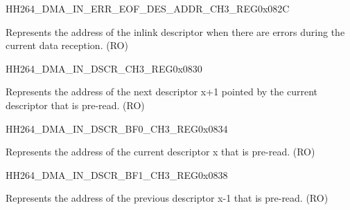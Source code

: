     
    \begin{register}{H}{H264\_DMA\_IN\_ERR\_EOF\_DES\_ADDR\_CH3\_REG}{0x082C}\label{regdesc:H264DMAINERREOFDESADDRCH3REG}
    \regnewline%
    \begin{regdesc}\begin{reglist}
    \label{fielddesc:H264DMAINERREOFDESADDRCH3}\item [H264\_DMA\_IN\_ERR\_EOF\_DES\_ADDR\_CH3] Represents the address of the inlink descriptor when there are errors during the current data reception. (RO)
    \end{reglist}\end{regdesc}
    \end{register}
    
    
    \begin{register}{H}{H264\_DMA\_IN\_DSCR\_CH3\_REG}{0x0830}\label{regdesc:H264DMAINDSCRCH3REG}
    \regnewline%
    \begin{regdesc}\begin{reglist}
    \label{fielddesc:H264DMAINLINKDSCRCH3}\item [H264\_DMA\_INLINK\_DSCR\_CH3] Represents the address of the next descriptor x+1 pointed by the current descriptor that is pre-read. (RO)
    \end{reglist}\end{regdesc}
    \end{register}
    
    
    \begin{register}{H}{H264\_DMA\_IN\_DSCR\_BF0\_CH3\_REG}{0x0834}\label{regdesc:H264DMAINDSCRBF0CH3REG}
    \regnewline%
    \begin{regdesc}\begin{reglist}
    \label{fielddesc:H264DMAINLINKDSCRBF0CH3}\item [H264\_DMA\_INLINK\_DSCR\_BF0\_CH3] Represents the address of the current descriptor x that is pre-read. (RO)
    \end{reglist}\end{regdesc}
    \end{register}
    
    
    \begin{register}{H}{H264\_DMA\_IN\_DSCR\_BF1\_CH3\_REG}{0x0838}\label{regdesc:H264DMAINDSCRBF1CH3REG}
    \regnewline%
    \begin{regdesc}\begin{reglist}
    \label{fielddesc:H264DMAINLINKDSCRBF1CH3}\item [H264\_DMA\_INLINK\_DSCR\_BF1\_CH3] Represents the address of the previous descriptor x-1 that is pre-read. (RO)
    \end{reglist}\end{regdesc}
    \end{register}
    
